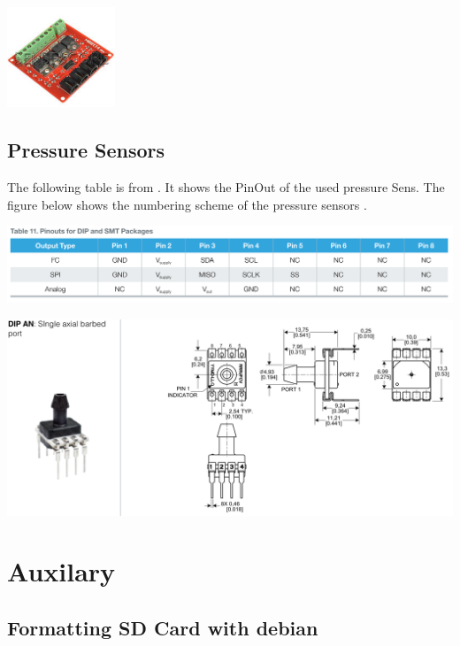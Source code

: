 \documentclass[
	fontsize=10pt
	paper=a4
]{scrartcl}
\begin{document}
\includegraphics[height=3cm]{Images/Excel/mosfet.PNG}



\subsection{Pressure Sensors}

The following table is from \cite[p. 30]{SSC_DATASHEET}. 
It shows the PinOut of the used pressure Sens.
The figure below shows the numbering scheme of the pressure sensors \cite[p. 19]{SSC_DATASHEET}.

\includegraphics[width=.9\textwidth]{Images/PressureSensor/PinOut.PNG}

\includegraphics[width=.9\textwidth]{Images/PressureSensor/PinNumbering.PNG}







\clearpage
\section{Auxilary}

\subsection{Formatting SD Card with debian}
\end{document}

